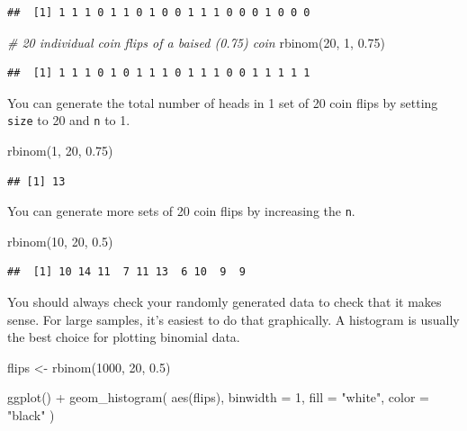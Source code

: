 \documentclass[
  oneside]{book}
\newenvironment{Shaded}{\begin{snugshade}}{\end{snugshade}}
\newcommand{\AttributeTok}[1]{\textcolor[rgb]{0.77,0.63,0.00}{#1}}
\newcommand{\CommentTok}[1]{\textcolor[rgb]{0.56,0.35,0.01}{\textit{#1}}}
\newcommand{\DecValTok}[1]{\textcolor[rgb]{0.00,0.00,0.81}{#1}}
\newcommand{\FloatTok}[1]{\textcolor[rgb]{0.00,0.00,0.81}{#1}}
\newcommand{\FunctionTok}[1]{\textcolor[rgb]{0.00,0.00,0.00}{#1}}
\newcommand{\NormalTok}[1]{#1}
\newcommand{\OtherTok}[1]{\textcolor[rgb]{0.56,0.35,0.01}{#1}}
\newcommand{\SpecialCharTok}[1]{\textcolor[rgb]{0.00,0.00,0.00}{#1}}
\newcommand{\StringTok}[1]{\textcolor[rgb]{0.31,0.60,0.02}{#1}}
\begin{document}
\begin{verbatim}
##  [1] 1 1 1 0 1 1 0 1 0 0 1 1 1 0 0 0 1 0 0 0
\end{verbatim}

\begin{Shaded}
\begin{Highlighting}[]
\CommentTok{\# 20 individual coin flips of a baised (0.75) coin}
\FunctionTok{rbinom}\NormalTok{(}\DecValTok{20}\NormalTok{, }\DecValTok{1}\NormalTok{, }\FloatTok{0.75}\NormalTok{)}
\end{Highlighting}
\end{Shaded}

\begin{verbatim}
##  [1] 1 1 1 0 1 0 1 1 1 0 1 1 1 0 0 1 1 1 1 1
\end{verbatim}

You can generate the total number of heads in 1 set of 20 coin flips by setting \texttt{size} to 20 and \texttt{n} to 1.

\begin{Shaded}
\begin{Highlighting}[]
\FunctionTok{rbinom}\NormalTok{(}\DecValTok{1}\NormalTok{, }\DecValTok{20}\NormalTok{, }\FloatTok{0.75}\NormalTok{)}
\end{Highlighting}
\end{Shaded}

\begin{verbatim}
## [1] 13
\end{verbatim}

You can generate more sets of 20 coin flips by increasing the \texttt{n}.

\begin{Shaded}
\begin{Highlighting}[]
\FunctionTok{rbinom}\NormalTok{(}\DecValTok{10}\NormalTok{, }\DecValTok{20}\NormalTok{, }\FloatTok{0.5}\NormalTok{)}
\end{Highlighting}
\end{Shaded}

\begin{verbatim}
##  [1] 10 14 11  7 11 13  6 10  9  9
\end{verbatim}

You should always check your randomly generated data to check that it makes sense. For large samples, it's easiest to do that graphically. A histogram is usually the best choice for plotting binomial data.

\begin{Shaded}
\begin{Highlighting}[]
\NormalTok{flips }\OtherTok{\textless{}{-}} \FunctionTok{rbinom}\NormalTok{(}\DecValTok{1000}\NormalTok{, }\DecValTok{20}\NormalTok{, }\FloatTok{0.5}\NormalTok{)}

\FunctionTok{ggplot}\NormalTok{() }\SpecialCharTok{+}
  \FunctionTok{geom\_histogram}\NormalTok{(}
    \FunctionTok{aes}\NormalTok{(flips), }
    \AttributeTok{binwidth =} \DecValTok{1}\NormalTok{, }
    \AttributeTok{fill =} \StringTok{"white"}\NormalTok{, }
    \AttributeTok{color =} \StringTok{"black"}
\NormalTok{  )}
\end{Highlighting}
\end{Shaded}
\end{document}
